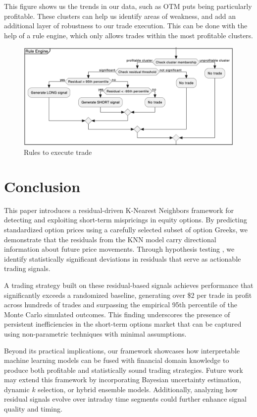 \documentclass{article}
\begin{document}
This figure shows us the trends in our data, such as OTM puts being particularly profitable. These clusters can help us identify areas of weakness, and add an additional layer of robustness to our trade execution. This can be done with the help of a rule engine, which only allows trades within the most profitable clusters.

\begin{figure}[h]
  \centering
  \includegraphics[width=0.8\linewidth]{data/results/algo.png}
  \caption{Rules to execute trade}
  \label{fig:algo}
\end{figure}

\section{Conclusion}

This paper introduces a residual-driven K-Nearest Neighbors framework for detecting and exploiting short-term mispricings in equity options. By predicting standardized option prices using a carefully selected subset of option Greeks, we demonstrate that the residuals from the KNN model carry directional information about future price movements. Through hypothesis testing , we identify statistically significant deviations in residuals that serve as actionable trading signals.

A trading strategy built on these residual-based signals achieves performance that significantly exceeds a randomized baseline, generating over \$2 per trade in profit across hundreds of trades and surpassing the empirical 95th percentile of the Monte Carlo simulated outcomes. This finding underscores the presence of persistent inefficiencies in the short-term options market that can be captured using non-parametric techniques with minimal assumptions.

Beyond its practical implications, our framework showcases how interpretable machine learning models can be fused with financial domain knowledge to produce both profitable and statistically sound trading strategies. Future work may extend this framework by incorporating Bayesian uncertainty estimation, dynamic $k$ selection, or hybrid ensemble models. Additionally, analyzing how residual signals evolve over intraday time segments could further enhance signal quality and timing.
\end{document}
